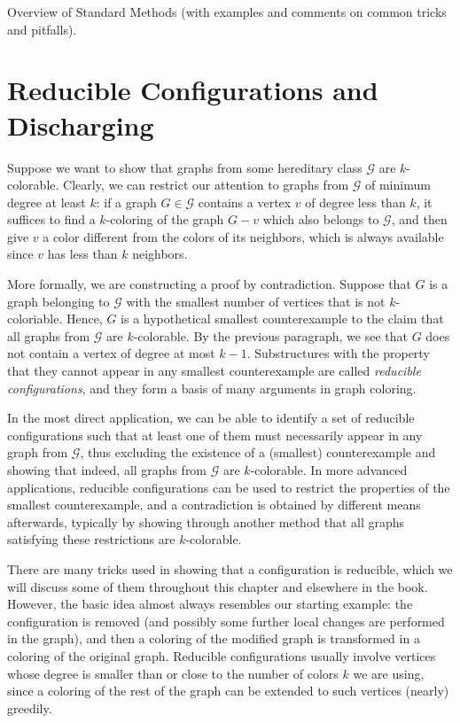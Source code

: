 \documentclass[12pt,twoside,openright,a4paper]{book}
\newcommand{\GG}{\mathcal{G}}
\begin{document}
Overview of Standard Methods (with examples and comments on common tricks and pitfalls).

\chapter{Reducible Configurations and Discharging}\label{chap:redu}

Suppose we want to show that graphs from some hereditary class $\GG$ are $k$-colorable.  Clearly, we can
restrict our attention to graphs from $\GG$ of minimum degree at least $k$: if a graph $G\in \GG$
contains a vertex $v$ of degree less than $k$, it suffices to find a $k$-coloring of the graph $G-v$
which also belongs to $\GG$, and then give $v$ a color different from the colors of its neighbors,
which is always available since $v$ has less than $k$ neighbors.

More formally, we are constructing a proof by contradiction.  Suppose that $G$ is a graph belonging to $\GG$
with the smallest number of vertices that is not $k$-coloriable.  Hence, $G$ is a hypothetical smallest counterexample
to the claim that all graphs from $\GG$ are $k$-colorable.
By the previous paragraph, we see that $G$ does not contain a vertex of degree at most $k-1$.
Substructures with the property that they cannot appear in any smallest counterexample
are called \emph{reducible configurations}, and they form a basis of many arguments in graph coloring.

In the most direct application, we can be able to identify a set of reducible configurations such that
at least one of them must necessarily appear in any graph from $\GG$, thus excluding the existence of
a (smallest) counterexample and showing that indeed, all graphs from $\GG$ are $k$-colorable.
In more advanced applications, reducible configurations can be used to restrict the properties
of the smallest counterexample, and a contradiction is obtained by different means afterwards, typically
by showing through another method that all graphs satisfying these restrictions are $k$-colorable.

There are many tricks used in showing that a configuration is reducible, which we will discuss some
of them throughout this chapter and elsewhere in the book. However, the basic idea almost always resembles
our starting example: the configuration is removed (and possibly some further local changes are
performed in the graph), and then a coloring of the modified graph is transformed in a coloring of the
original graph.  Reducible configurations usually involve vertices whose degree is
smaller than or close to the number of colors $k$ we are using, since a coloring of the rest of the graph
can be extended to such vertices (nearly) greedily.
\end{document}
